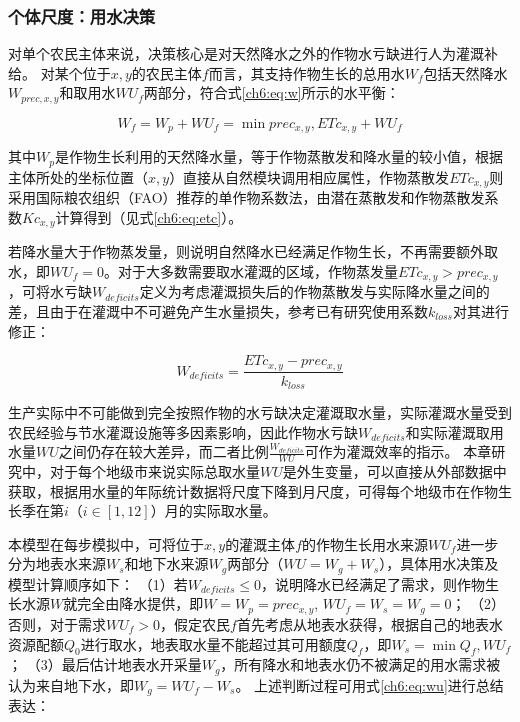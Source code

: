 \subsubsection{个体尺度：用水决策}

对单个农民主体来说，决策核心是对天然降水之外的作物水亏缺进行人为灌溉补给。
对某个位于$x, y$的农民主体$f$而言，其支持作物生长的总用水$W_f$包括天然降水$W_{prec, x, y}$和取用水$WU_f$两部分，符合式\ref{ch6:eq:w}所示的水平衡：

\begin{equation}
    \label{ch6:eq:w}
    W_f = W_{p} + WU_{f} = \min{prec_{x, y}, ETc_{x, y}} + WU_{f}
\end{equation}

其中$W_{p}$是作物生长利用的天然降水量，等于作物蒸散发和降水量的较小值，根据主体所处的坐标位置（$x, y$）直接从自然模块调用相应属性，作物蒸散发$ETc_{x, y}$则采用国际粮农组织（FAO）推荐的单作物系数法，由潜在蒸散发和作物蒸散发系数$Kc_{x, y}$计算得到（见式\ref{ch6:eq:etc}）。

若降水量大于作物蒸发量，则说明自然降水已经满足作物生长，不再需要额外取水，即$WU_{f} = 0$。对于大多数需要取水灌溉的区域，作物蒸发量$ETc_{x, y} > prec_{x, y}$，可将水亏缺$W_{deficits}$定义为考虑灌溉损失后的作物蒸散发与实际降水量之间的差，且由于在灌溉中不可避免产生水量损失，参考已有研究使用系数$k_{loss}$对其进行修正\cite{chen2023}：

\begin{equation}
    \label{ch6:eq:deficits}
    W_{deficits} = \frac{ETc_{x, y} - prec_{x, y}}{k_{loss}}
\end{equation}

生产实际中不可能做到完全按照作物的水亏缺决定灌溉取水量，实际灌溉水量受到农民经验与节水灌溉设施等多因素影响，因此作物水亏缺$W_{deficits}$和实际灌溉取用水量$WU$之间仍存在较大差异，而二者比例$\frac{W_{deficits}}{WU}$可作为灌溉效率的指示。
本章研究中，对于每个地级市来说实际总取水量$WU$是外生变量，可以直接从外部数据中获取，根据用水量的年际统计数据将尺度下降到月尺度，可得每个地级市在作物生长季在第$i$（$i \in [1, 12]$）月的实际取水量。

本模型在每步模拟中，可将位于$x, y$的灌溉主体$f$的作物生长用水来源$WU_f$进一步分为地表水来源$W_s$和地下水来源$W_g$两部分（$WU = W_g + W_s$），具体用水决策及模型计算顺序如下：
（1）若$W_{deficits} \leq 0$，说明降水已经满足了需求，则作物生长水源$W$就完全由降水提供，即$W = W_p = prec_{x, y}$, $WU_f = W_{s} = W_{g} =0$；
（2）否则，对于需求$WU_f > 0$，假定农民$f$首先考虑从地表水获得，根据自己的地表水资源配额$Q_{0}$进行取水，地表取水量不能超过其可用额度$Q_f$，即$W_s = \min{Q_f, WU_f}$；
（3）最后估计地表水开采量$W_g$，所有降水和地表水仍不被满足的用水需求被认为来自地下水，即$W_g = WU_f - W_s$。
上述判断过程可用式\ref{ch6:eq:wu}进行总结表达：


